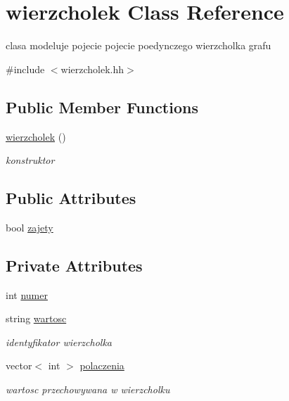 \hypertarget{classwierzcholek}{\section{wierzcholek \-Class \-Reference}
\label{classwierzcholek}
}


clasa modeluje pojecie pojecie poedynczego wierzcholka grafu  




{\ttfamily \#include $<$wierzcholek.\-hh$>$}

\subsection*{\-Public \-Member \-Functions}
\begin{DoxyCompactItemize}
\item 
\hyperlink{classwierzcholek_a0e72695b032e7f750c51041e1a59673b}{wierzcholek} ()
\begin{DoxyCompactList}\small\item\em konstruktor \end{DoxyCompactList}\end{DoxyCompactItemize}
\subsection*{\-Public \-Attributes}
\begin{DoxyCompactItemize}
\item 
bool \hyperlink{classwierzcholek_ad67644b5f408397f28d7150d3bac76d2}{zajety}
\end{DoxyCompactItemize}
\subsection*{\-Private \-Attributes}
\begin{DoxyCompactItemize}
\item 
int \hyperlink{classwierzcholek_a66aaea6b1187250f7100542adc1617d2}{numer}
\item 
string \hyperlink{classwierzcholek_a19aa16bf7e01a987fcc360e5da902209}{wartosc}
\begin{DoxyCompactList}\small\item\em identyfikator wierzcholka \end{DoxyCompactList}\item 
vector$<$ int $>$ \hyperlink{classwierzcholek_a30b8190b35ec29e5cc13910ce56e59e9}{polaczenia}
\begin{DoxyCompactList}\small\item\em wartosc przechowywana w wierzcholku \end{DoxyCompactList}\end{DoxyCompactItemize}
